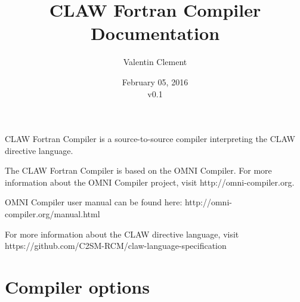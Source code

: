 \documentclass{article}
\title{CLAW Fortran Compiler Documentation}
\author{Valentin Clement}
\date{February 05, 2016\\\vspace{1em}v0.1}
\begin{document}
\maketitle

CLAW Fortran Compiler is a source-to-source compiler interpreting the CLAW
directive language.

The CLAW Fortran Compiler is based on the OMNI Compiler. For more information 
about the OMNI Compiler project, visit http://omni-compiler.org.
 
OMNI Compiler user manual can be found here: http://omni-compiler.org/manual.html

For more information about the CLAW directive language, visit
https://github.com/C2SM-RCM/claw-language-specification


\section{Compiler options}
\end{document}
